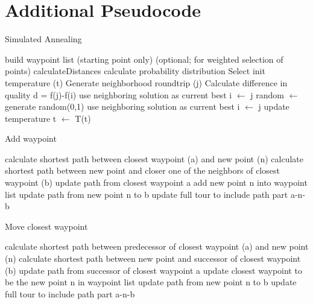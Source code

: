 \chapter{Additional Pseudocode}


\begin{breakablealgorithm}
	\caption{Simulated Annealing}
	\label{alg:SAImplementation}
	\begin{algorithmic}[1]
		\STATE build waypoint list (starting point only)
		\STATE (optional; for weighted selection of points) calculateDistances
		\STATE calculate probability distribution
		\STATE Select init temperature (t)
		\STATE Generate neighborhood roundtrip (j)
		\STATE Calculate difference in quality d = f(j)-f(i)
		\STATE use neighboring solution as current best i $\gets$ j
		\ELSE 
		\STATE random $\gets$ generate random(0,1)
		\STATE use neighboring solution as current best i $\gets$ j
		\ENDIF
		\ENDIF
		\ENDFOR
		\STATE update temperature t $\gets$ T(t)
		\ENDFOR
	\end{algorithmic}
\end{breakablealgorithm}



\begin{breakablealgorithm}
	\caption{Add waypoint}
	\label{alg:SAGenerateNeigborhoodAdd}
	\begin{algorithmic}[1]
		\STATE calculate shortest path between closest waypoint (a) and new point (n)
		\STATE calculate shortest path between new point and closer one of the neighbors of closest waypoint (b)
		\STATE update path from closest waypoint a
		\STATE add new point n into waypoint list
		\STATE update path from new point n to b
		\STATE update full tour to include path part a-n-b
	\end{algorithmic}
\end{breakablealgorithm}

\begin{breakablealgorithm}
	\caption{Move closest waypoint}
	\label{alg:SAGenerateNeigborhoodMove}
	\begin{algorithmic}[1]
		\STATE calculate shortest path between predecessor of closest waypoint (a) and new point (n)
		\STATE calculate shortest path between new point and successor of closest waypoint (b)
		\STATE update path from successor of closest waypoint a
		\STATE update closest waypoint to be the new point n in waypoint list
		\STATE update path from new point n to b
		\STATE update full tour to include path part a-n-b
	\end{algorithmic}
\end{breakablealgorithm}


